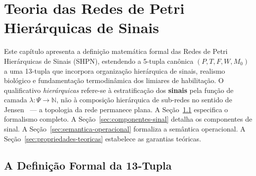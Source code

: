 \chapter{Teoria das Redes de Petri Hierárquicas de Sinais}
\label{ch:shpn}

Este capítulo apresenta a definição matemática formal das Redes de Petri
Hierárquicas de Sinais (SHPN), estendendo a 5-tupla canônica $(P, T, F, W, M_0)$
a uma 13-tupla que incorpora organização hierárquica de sinais, realismo
biológico e fundamentação termodinâmica dos limiares de habilitação.
O qualificativo \emph{hierárquicas} refere-se à estratificação dos
\textbf{sinais} pela função de camada $\lambda: \Psi \to \mathbb{N}$, não à
composição hierárquica de sub-redes no sentido de Jensen~\cite{Jensen1997CPN} ---
a topologia da rede permanece plana. A Seção~\ref{sec:definicao-13tupla} especifica o formalismo completo.
A Seção~\ref{sec:componentes-sinal} detalha os componentes de sinal. A
Seção~\ref{sec:semantica-operacional} formaliza a semântica operacional. A
Seção~\ref{sec:propriedades-teoricas} estabelece as garantias teóricas.

\section{A Definição Formal da 13-Tupla}
\label{sec:definicao-13tupla}

